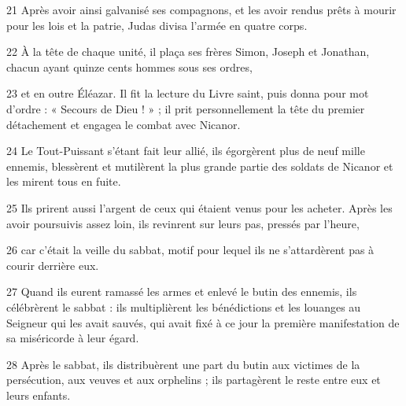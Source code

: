 
21 Après avoir ainsi galvanisé ses compagnons, et les avoir rendus prêts à mourir pour les lois et la patrie, Judas divisa l’armée en quatre corps.

22 À la tête de chaque unité, il plaça ses frères Simon, Joseph et Jonathan, chacun ayant quinze cents hommes sous ses ordres,

23 et en outre Éléazar. Il fit la lecture du Livre saint, puis donna pour mot d’ordre : « Secours de Dieu ! » ; il prit personnellement la tête du premier détachement et engagea le combat avec Nicanor.

24 Le Tout-Puissant s’étant fait leur allié, ils égorgèrent plus de neuf mille ennemis, blessèrent et mutilèrent la plus grande partie des soldats de Nicanor et les mirent tous en fuite.

25 Ils prirent aussi l’argent de ceux qui étaient venus pour les acheter. Après les avoir poursuivis assez loin, ils revinrent sur leurs pas, pressés par l’heure,

26 car c’était la veille du sabbat, motif pour lequel ils ne s’attardèrent pas à courir derrière eux.

27 Quand ils eurent ramassé les armes et enlevé le butin des ennemis, ils célébrèrent le sabbat : ils multiplièrent les bénédictions et les louanges au Seigneur qui les avait sauvés, qui avait fixé à ce jour la première manifestation de sa miséricorde à leur égard.

28 Après le sabbat, ils distribuèrent une part du butin aux victimes de la persécution, aux veuves et aux orphelins ; ils partagèrent le reste entre eux et leurs enfants.